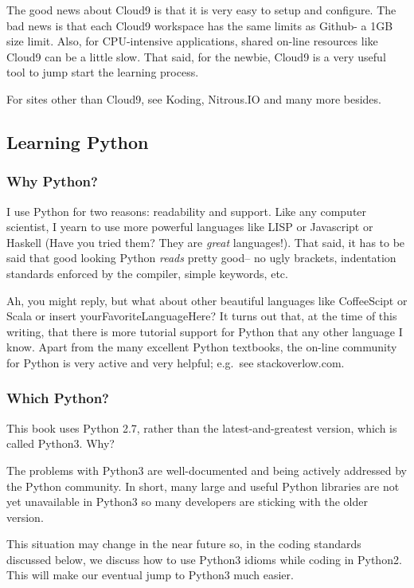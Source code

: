 The good news about Cloud9 is that it is very easy to setup and
configure. The bad news is that each Cloud9 workspace has the same
limits as Github- a 1GB size limit. Also, for CPU-intensive
applications, shared on-line resources like Cloud9 can be a little slow.
That said, for the newbie, Cloud9 is a very useful tool to jump start
the learning process.

For sites other than Cloud9, see Koding, Nitrous.IO and many more
besides.

\subsection{Learning Python}\label{learning-python}

\subsubsection{Why Python?}\label{why-python}

I use Python for two reasons: readability and support. Like any computer
scientist, I yearn to use more powerful languages like LISP or
Javascript or Haskell (Have you tried them? They are \emph{great}
languages!). That said, it has to be said that good looking Python
\emph{reads} pretty good-- no ugly brackets, indentation standards
enforced by the compiler, simple keywords, etc.

Ah, you might reply, but what about other beautiful languages like
CoffeeScipt or Scala or insert yourFavoriteLanguageHere? It turns out
that, at the time of this writing, that there is more tutorial support
for Python that any other language I know. Apart from the many excellent
Python textbooks, the on-line community for Python is very active and
very helpful; e.g.~see stackoverlow.com.

\subsubsection{Which Python?}\label{which-python}

This book uses Python 2.7, rather than the latest-and-greatest version,
which is called Python3. Why?

The problems with Python3 are well-documented and being actively
addressed by the Python community. In short, many large and useful
Python libraries are not yet unavailable in Python3 so many developers
are sticking with the older version.

This situation may change in the near future so, in the coding standards
discussed below, we discuss how to use Python3 idioms while coding in
Python2. This will make our eventual jump to Python3 much easier.

